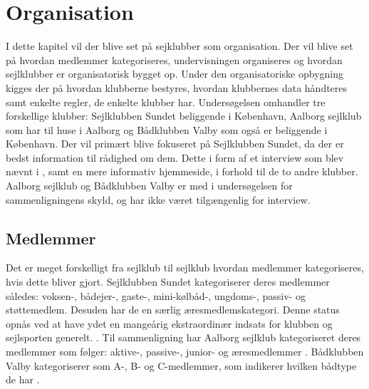 \chapter{Organisation}\label{chap:organisation}

I dette kapitel vil der blive set på sejklubber som organisation. Der vil blive set på hvordan medlemmer kategoriseres,
undervisningen organiseres og hvordan sejlklubber er organisatorisk bygget op. Under den organisatoriske opbygning
kigges der på hvordan klubberne bestyres, hvordan klubbernes data håndteres samt enkelte regler, de enkelte klubber har.
Undersøgelsen omhandler tre forskellige klubber: Sejlklubben Sundet beliggende i København, Aalborg sejlklub som har
til huse i Aalborg og Bådklubben Valby som også er beliggende i København. Der vil primært blive fokuseret på
Sejlklubben Sundet, da der er bedst information til rådighed om dem. Dette i form af et interview som blev nævnt i
, samt en mere informativ hjemmeside, i forhold til de to andre klubber.
Aalborg sejlklub og Bådklubben Valby er med i undersøgelsen for sammenligningens skyld, og har ikke været tilgængenlig 
for interview. 


\section{Medlemmer}\label{sec:organisation-medlemmer}

Det er meget forskelligt fra sejlklub til sejlklub hvordan medlemmer kategoriseres, hvis dette bliver gjort. Sejlklubben
Sundet kategoriserer deres medlemmer således: voksen-, bådejer-, gaste-, mini-kølbåd-, ungdoms-, passiv- og
støttemedlem. Desuden har de en særlig æresmedlemskategori. Denne status opnås ved at have ydet en mangeårig
ekstraordinær indsats for klubben og sejlsporten generelt. \citep{sundet_vedtaegter}. \newline
Til sammenligning har Aalborg sejlklub kategoriseret deres medlemmer som følger: aktive-, passive-, junior- og
æresmedlemmer \citep{aalborg_sejlklub_vedtaegter}. \newline
Bådklubben Valby kategoriserer som A-, B- og C-medlemmer, som indikerer hvilken bådtype de har
\citep{badklubben_valby_love}.

